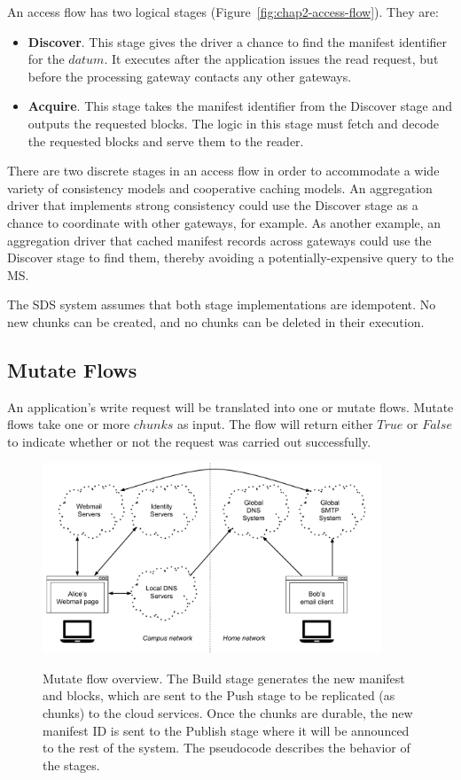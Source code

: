 An access flow has two logical stages (Figure~\ref{fig:chap2-access-flow}).  They are:

\begin{itemize}
    \item \textbf{Discover}.  This stage gives the driver a chance to find the
manifest identifier for the $datum$.  It executes after the application issues
the read request, but before the processing gateway contacts any other gateways.
    \item \textbf{Acquire}.  This stage takes the manifest identifier from the
Discover stage and outputs the requested blocks.  The logic in this 
stage must fetch and decode the requested blocks and serve them to the reader.
\end{itemize}

There are two discrete stages in an access flow in order to accommodate a wide
variety of consistency models and cooperative caching models.  An
aggregation driver that implements strong consistency could use the Discover
stage as a chance to coordinate with other gateways, for example.  As
another example, an aggregation driver that cached manifest records
across gateways could use the Discover stage to find them, thereby avoiding a
potentially-expensive query to the MS.

The SDS system assumes that both stage implementations are idempotent.  No new
chunks can be created, and no chunks can be deleted in their execution.

\subsection{Mutate Flows}

An application's write request will be translated into one or mutate flows.
Mutate flows take one or more $chunks$ as input.  The flow will return
either $True$ or $False$ to indicate whether or not the request was
carried out successfully.

\begin{figure}[h]
   \caption{Mutate flow overview.  The Build stage generates the new manifest
   and blocks, which are sent to the Push stage to be replicated (as chunks) to
   the cloud services.  Once the chunks are durable, the new manifest ID is
   sent to the Publish stage where it will be announced to the rest of the
   system.  The pseudocode describes the behavior of the stages.}
   \centering
   \includegraphics[width=0.9\textwidth,page=8]{figures/dissertation-figures}
   \label{fig:chap2-mutate-flow}
\end{figure}

